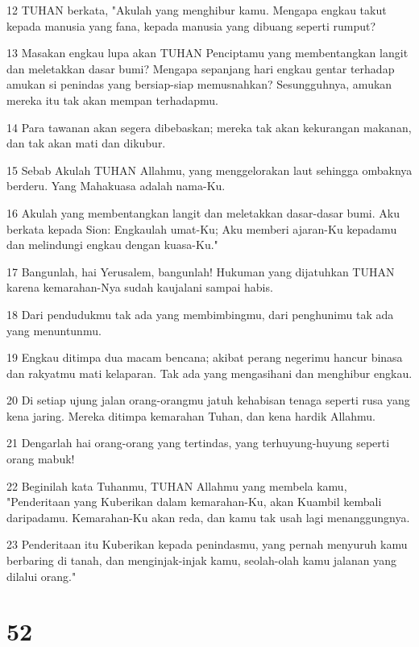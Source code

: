 \par 12 TUHAN berkata, "Akulah yang menghibur kamu. Mengapa engkau takut kepada manusia yang fana, kepada manusia yang dibuang seperti rumput?
\par 13 Masakan engkau lupa akan TUHAN Penciptamu yang membentangkan langit dan meletakkan dasar bumi? Mengapa sepanjang hari engkau gentar terhadap amukan si penindas yang bersiap-siap memusnahkan? Sesungguhnya, amukan mereka itu tak akan mempan terhadapmu.
\par 14 Para tawanan akan segera dibebaskan; mereka tak akan kekurangan makanan, dan tak akan mati dan dikubur.
\par 15 Sebab Akulah TUHAN Allahmu, yang menggelorakan laut sehingga ombaknya berderu. Yang Mahakuasa adalah nama-Ku.
\par 16 Akulah yang membentangkan langit dan meletakkan dasar-dasar bumi. Aku berkata kepada Sion: Engkaulah umat-Ku; Aku memberi ajaran-Ku kepadamu dan melindungi engkau dengan kuasa-Ku."
\par 17 Bangunlah, hai Yerusalem, bangunlah! Hukuman yang dijatuhkan TUHAN karena kemarahan-Nya sudah kaujalani sampai habis.
\par 18 Dari pendudukmu tak ada yang membimbingmu, dari penghunimu tak ada yang menuntunmu.
\par 19 Engkau ditimpa dua macam bencana; akibat perang negerimu hancur binasa dan rakyatmu mati kelaparan. Tak ada yang mengasihani dan menghibur engkau.
\par 20 Di setiap ujung jalan orang-orangmu jatuh kehabisan tenaga seperti rusa yang kena jaring. Mereka ditimpa kemarahan Tuhan, dan kena hardik Allahmu.
\par 21 Dengarlah hai orang-orang yang tertindas, yang terhuyung-huyung seperti orang mabuk!
\par 22 Beginilah kata Tuhanmu, TUHAN Allahmu yang membela kamu, "Penderitaan yang Kuberikan dalam kemarahan-Ku, akan Kuambil kembali daripadamu. Kemarahan-Ku akan reda, dan kamu tak usah lagi menanggungnya.
\par 23 Penderitaan itu Kuberikan kepada penindasmu, yang pernah menyuruh kamu berbaring di tanah, dan menginjak-injak kamu, seolah-olah kamu jalanan yang dilalui orang."

\chapter{52}

